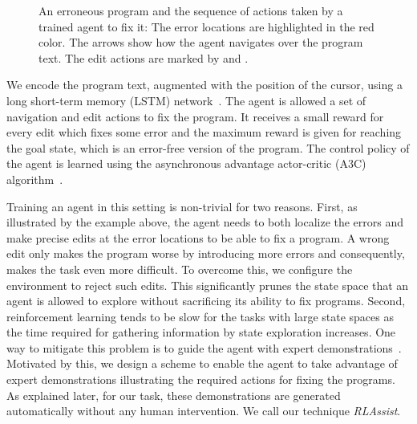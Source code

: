 \documentclass{article}
\begin{document}
\begin{figure}[t]
\caption{An erroneous program and the sequence of actions taken by a trained agent to
  fix it: The error locations are highlighted in the red color. The arrows show
  how the agent navigates over the program text. The edit actions are marked
  by  and .
}
\label{fig:RLAssist-illustraion}
\end{figure}

We encode the program text, augmented with the position of the cursor,
using a long short-term memory (LSTM) network~\cite{hochreiter1997long}.
The agent is allowed a set of navigation and edit actions to fix the program.
It receives a small reward for every edit which fixes some error and the maximum reward is given for reaching the goal state, which is an error-free version of the program.
The control policy of the agent is learned using the asynchronous advantage actor-critic (A3C) algorithm~\cite{mnih2016asynchronous}.

Training an agent in this setting is non-trivial for two reasons.
First, as illustrated by the example above, the agent needs to both localize
the errors and make precise edits at the error locations to be able to fix a program.
A wrong edit only makes the program worse by introducing more errors and
consequently, makes the task even more difficult.
To overcome this, we configure the environment to reject such edits.
This significantly prunes the state space that an agent is allowed to explore
without sacrificing its ability to fix programs. 
Second, reinforcement learning tends to be slow for the tasks with large state spaces as the time required for gathering information by state exploration increases.
One way to mitigate this problem is to guide the agent with expert demonstrations~\cite{Argall-2009-17073}.
Motivated by this, we design a scheme to 
enable the agent to take advantage of expert demonstrations
illustrating the required actions for fixing the programs.
As explained later, for our task, these demonstrations are generated automatically without any human intervention.
We call our technique \emph{RLAssist}.
\end{document}
